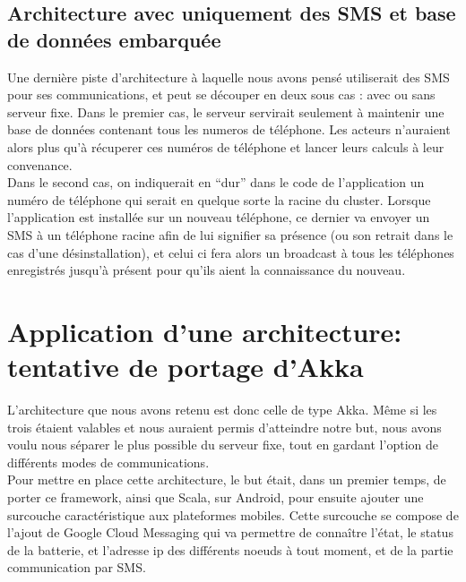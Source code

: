 \documentclass[a4paper,12pt]{article}
\begin{document}
\subsection{Architecture avec uniquement des SMS et base de données embarquée}
Une dernière piste d’architecture à laquelle nous avons pensé utiliserait des
SMS pour ses communications, et peut se découper en deux sous cas : avec ou
sans serveur fixe. Dans le premier cas, le serveur servirait seulement à
maintenir une base de données contenant tous les numeros de téléphone. Les
acteurs n’auraient alors plus qu’à récuperer ces numéros de téléphone et lancer
leurs calculs à leur convenance.\\ Dans le second cas, on indiquerait en “dur”
dans le code de l’application un numéro de téléphone qui serait en quelque
sorte la racine du cluster. Lorsque l’application est installée sur un nouveau
téléphone, ce dernier va envoyer un SMS à un téléphone racine afin de lui
signifier sa présence (ou son retrait dans le cas d’une désinstallation), et
celui ci fera alors un broadcast à tous les téléphones enregistrés jusqu’à
présent pour qu’ils aient la connaissance du nouveau.

\section{Application d'une architecture: tentative de portage d'Akka}
L’architecture que nous avons retenu est donc celle de type Akka. Même si les
trois étaient valables et nous auraient permis d’atteindre notre but, nous
avons voulu nous séparer le plus possible du serveur fixe, tout en gardant
l’option de différents modes de communications.\\ Pour mettre en place cette
architecture, le but était, dans un premier temps, de porter ce framework,
ainsi que Scala, sur Android, pour ensuite ajouter une surcouche
caractéristique aux plateformes mobiles. Cette surcouche se compose de l’ajout
de Google Cloud Messaging qui va permettre de connaître l’état, le status de la
batterie, et l’adresse ip des différents noeuds à tout moment, et de la partie
communication par SMS.

\newpage
\end{document}
